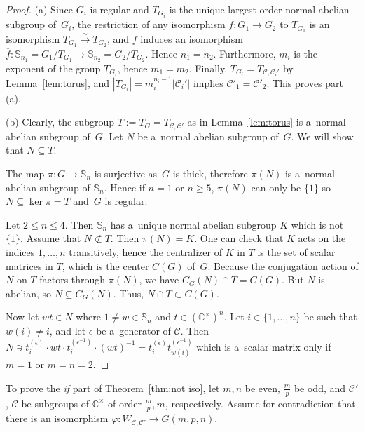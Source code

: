 \documentclass[pdftex]{sigma}
\begin{document}
\begin{proof}
(a) Since $G_i$ is regular and $T_{G_i}$ is the unique largest order normal abelian subgroup of~$G_i$, the restriction
of any isomorphism $f\colon G_1\to G_2$ to $T_{G_1}$ is an isomorphism $T_{G_1}\xrightarrow{\sim} T_{G_2}$, and $f$
induces an isomorphism $\overline f\colon \mathbb S_{n_1}=G_1/T_{G_1} \to \mathbb S_{n_2}=G_2/T_{G_2}$.
Hence $n_1=n_2$.
Furthermore, $m_i$ is the exponent of the group $T_{G_i}$, hence $m_1=m_2$.
Finally, $T_{G_i}=T_{{\mathcal C},{\mathcal C}_i'}$ by Lemma~\ref{lem:torus}, and $|T_{G_i}|=m_i^{n_i-1}|{\mathcal
C}_i'|$ implies ${\mathcal C}'_1={\mathcal C}'_2$.
This proves part (a).

(b) Clearly, the subgroup $T:=T_G=T_{{\mathcal C},{\mathcal C}'}$ as in Lemma~\ref{lem:torus} is a~normal abelian
subgroup of~$G$.
Let $N$ be a~normal abelian subgroup of~$G$.
We will show that $N\subseteq T$.

The map $\pi\colon G \to \mathbb S_n$ is surjective as~$G$ is thick, therefore $\pi(N)$ is a~normal abelian subgroup of
$\mathbb S_n$.
Hence if $n=1$ or $n\ge 5$, $\pi(N)$ can only be $\{1\}$ so $N\subseteq \ker \pi=T$ and~$G$ is regular.

Let $2\le n\le 4$.
Then $\mathbb S_n$ has a~unique normal abelian subgroup $K$ which is not $\{1\}$.
Assume that $N\not\subset T$.
Then $\pi(N)=K$.
One can check that $K$ acts on the indices $1,\ldots,n$ transitively, hence the centralizer of $K$ in $T$ is the set of
scalar matrices in $T$, which is the center $C(G)$ of~$G$.
Because the conjugation action of $N$ on $T$ factors through $\pi(N)$, we have $C_G(N)\cap T=C(G)$.
But $N$ is abelian, so $N\subseteq C_G(N)$.
Thus, $N\cap T \subset C(G)$.

Now let $wt\in N$ where $1\ne w\in \mathbb S_n$ and $t\in (\mathbb C^\times)^n$.
Let $i\in \{1,\ldots,n\}$ be such that $w(i)\ne i$, and let $\epsilon$ be a~generator of ${\mathcal C}$.
Then $N \ni t_i^{(\epsilon)} \cdot wt \cdot t_i^{(\epsilon^{-1})} \cdot (wt)^{-1}= t_i^{(\epsilon)}
t_{w(i)}^{(\epsilon^{-1})}$ which is a~scalar matrix only if $m=1$ or $m=n=2$.
\end{proof}

To prove the \textit{if} part of Theorem~\ref{thm:not iso}, let $m,n$ be even, $\frac mp$ be odd, and ${\mathcal C}'$,
${\mathcal C}$ be subgroups of $\mathbb C^\times$ of order $\frac mp,m$, respectively.
Assume for contradiction that there is an isomorphism ${\varphi\colon W_{{\mathcal C},{\mathcal C}'}\to G(m,p,n)}$.
\end{document}
